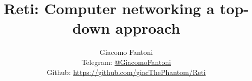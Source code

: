 
\title{\Huge \textbf{Reti: Computer networking a top-down approach}}
\author{
  Giacomo Fantoni \\
  \small Telegram: \href{https://t.me/GiacomoFantoni}{@GiacomoFantoni} \\[3pt]
  \small Github: \href{https://github.com/giacThePhantom/Reti}{https://github.com/giacThePhantom/Reti}}

\maketitle
\tableofcontents







